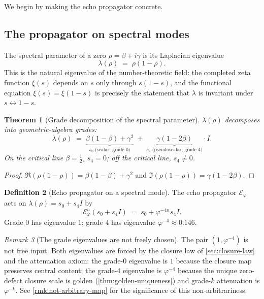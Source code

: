 \documentclass[11pt,a4paper]{article}
\theoremstyle{plain}
\newtheorem{theorem}{Theorem}[section]
\theoremstyle{definition}
\newtheorem{definition}[theorem]{Definition}
\theoremstyle{remark}
\newtheorem{remark}[theorem]{Remark}
\numberwithin{equation}{section}
\providecommand{\vp}{\varphi}
\providecommand{\half}{\tfrac{1}{2}}
\providecommand{\EF}{\mathcal{E}}
\begin{document}
We begin by making the echo propagator concrete.

\subsection{The propagator on spectral modes}

The spectral parameter of a zero $\rho = \beta + i\gamma$ is its
Laplacian eigenvalue
\[
  \lambda(\rho) \;=\; \rho(1 - \rho).
\]
This is the natural eigenvalue of the number-theoretic field: the
completed zeta function $\xi(s)$ depends on $s$ only through
$s(1 - s)$, and the functional equation $\xi(s) = \xi(1 - s)$ is
precisely the statement that $\lambda$ is invariant under
$s \leftrightarrow 1 - s$.

\begin{theorem}[Grade decomposition of the spectral parameter]
\label{thm:spectral-grade}
$\lambda(\rho)$ decomposes into geometric-algebra grades:
\begin{equation}
  \lambda(\rho)
   \;=\; \underbrace{\beta(1-\beta) + \gamma^2}_{s_0\;\text{(scalar, grade 0)}}
   \;+\; \underbrace{\gamma(1-2\beta)}_{s_4\;\text{(pseudoscalar, grade 4)}}\cdot I.
  \label{eq:spectral-grade}
\end{equation}
On the critical line $\beta = \half$, $s_4 = 0$; off the critical
line, $s_4 \ne 0$.
\end{theorem}

\begin{proof}
$\Re(\rho(1-\rho)) = \beta(1-\beta) + \gamma^2$ and
$\Im(\rho(1-\rho)) = \gamma(1-2\beta)$.
\end{proof}

\begin{definition}[Echo propagator on a spectral mode]
\label{def:echo-propagator}
The echo propagator $\EF_\vp$ acts on $\lambda(\rho) = s_0 + s_4 I$ by
\begin{equation}
  \EF_\vp^n(s_0 + s_4 I) \;=\; s_0 + \vp^{-4n} s_4 I.
  \label{eq:propagator}
\end{equation}
Grade $0$ has eigenvalue $1$; grade $4$ has eigenvalue
$\vp^{-4} \approx 0.146$.
\end{definition}

\begin{remark}[The grade eigenvalues are not freely chosen]
\label{rmk:eigenvalues-derived}
The pair $(1, \vp^{-4})$ is not free input.  Both eigenvalues are
forced by the closure law of \cref{sec:closure-law} and the
attenuation axiom: the grade-$0$ eigenvalue is $1$ because the
closure map preserves central content; the grade-$4$ eigenvalue
is $\vp^{-4}$ because the unique zero-defect closure scale is
golden (\cref{thm:golden-uniqueness}) and grade-$k$ attenuation
is $\vp^{-k}$.  See \cref{rmk:not-arbitrary-map} for the
significance of this non-arbitrariness.
\end{remark}
\end{document}
